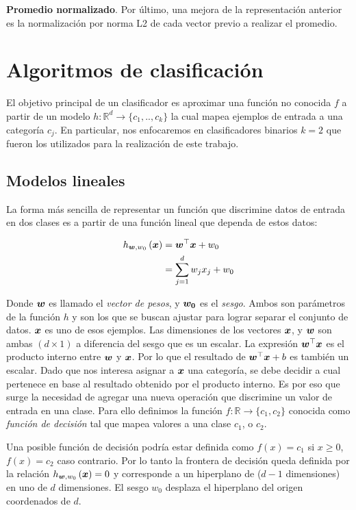 \textbf{Promedio normalizado}. Por último, una mejora de la representación
anterior es la normalización por norma L2 de cada vector previo a realizar el
promedio.

\section{Algoritmos de clasificación}

El objetivo principal de un clasificador es aproximar una función no conocida
$f$ a partir de un modelo $h: \mathbb{R}^d \rightarrow \{c_1,.., c_k\}$ la cual
mapea ejemplos de entrada a una categoría $c_j$. En particular, nos enfocaremos
en clasificadores binarios $k = 2$ que fueron los utilizados para la realización
de este trabajo.

\subsection{Modelos lineales}

La forma más sencilla de representar un función que discrimine datos de entrada
en dos clases es a partir de una función lineal que dependa de estos datos:

\begin{align*}
    h_{\boldsymbol{w}, w_0}\left( \boldsymbol{x} \right) &= \boldsymbol{w}^{\top} \boldsymbol{x} + w_0 \\
                                           &= \sum_{j = 1 }^{d} w_j x_j + w_0
\end{align*}

Donde $\boldsymbol{w}$ es llamado el \emph{vector de pesos}, y $\boldsymbol{w_0}$ es el
\emph{sesgo}. Ambos son parámetros de la función $h$ y son los que se buscan
ajustar para lograr separar el conjunto de datos. $\boldsymbol{x}$ es uno de esos
ejemplos. Las dimensiones de los vectores $\boldsymbol{x}$, y $\boldsymbol{w}$ son ambas $(d
\times 1)$ a diferencia del sesgo que es un escalar. La expresión
$\boldsymbol{w}^{\top} \boldsymbol{x}$ es el producto interno entre $\boldsymbol{w}$ y $\boldsymbol{x}$.
Por lo que el resultado de $\boldsymbol{w}^{\top} \boldsymbol{x} + b$ es también un escalar.
Dado que nos interesa asignar a $\boldsymbol{x}$ una categoría, se debe decidir a cual
pertenece en base al resultado obtenido por el producto interno. Es por eso que
surge la necesidad de agregar una nueva operación que discrimine un valor de
entrada en una clase. Para ello definimos la función $f: \mathbb{R} \rightarrow
\{c_1, c_2\}$ conocida como \emph{función de decisión} tal que mapea valores a
una clase $c_1$, o $c_2$.

Una posible función de decisión podría estar definida como $f(x) = c_1$ si $x
\geq 0$, $f(x) = c_2$ caso contrario. Por lo tanto la frontera de decisión queda
definida por la relación $h_{\boldsymbol{w}, w_0}\left( \boldsymbol{x} \right) = 0$ y
corresponde a un hiperplano de ($d-1$ dimensiones) en uno de $d$ dimensiones. El
sesgo $w_0$ desplaza el hiperplano del origen coordenados de $d$.


